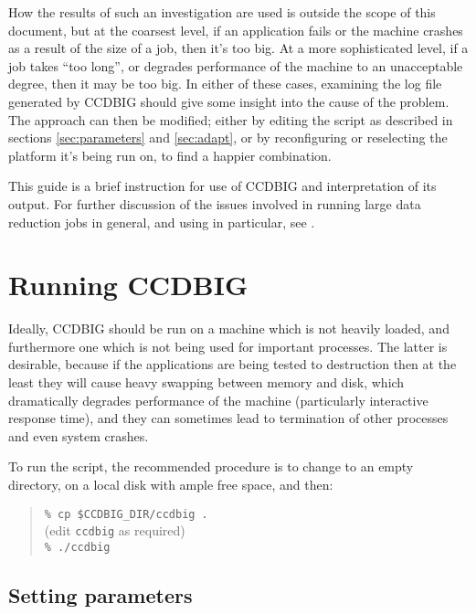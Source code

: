 How the results of such an investigation are used is
outside the scope of this document,
but at the coarsest level, if an application fails 
or the machine crashes
as a result of the size of a job,
then it's too big. 
At a more sophisticated level, if a job takes ``too long'',
or degrades performance of the machine to an unacceptable degree,
then it may be too big.
In either of these cases, examining the log file
generated by CCDBIG should give some
insight into the cause of the problem.
The approach
can then be modified;
either by editing the script as described in sections
\ref{sec:parameters} and \ref{sec:adapt},
or by reconfiguring or reselecting the platform it's being run on,
to find a happier combination.

This guide is a brief instruction for use
of CCDBIG and interpretation of its output.
For further discussion of the issues involved in running large
data reduction jobs in general, and using {\CCDPref} in particular,
see .



\section{Running CCDBIG}

Ideally, CCDBIG should be run on a machine which is not
heavily loaded, and furthermore one which is not being used
for important processes.
The latter is desirable, because if the {\CCDPref} applications
are being tested to destruction then at the least they will
cause heavy swapping between memory and disk, which 
dramatically degrades performance of the machine 
(particularly interactive response time),
and they can sometimes lead to termination of other processes and
even system crashes.

To run the script, the recommended procedure is
to change to an empty directory, on a local disk with 
ample free space, and then:
\begin{quote}
{\tt \% cp \$CCDBIG\_DIR/ccdbig .} \\
\hspace*{3em} (edit {\tt ccdbig} as required) \\
{\tt \% ./ccdbig}
\end{quote}


\subsection{Setting parameters}
 \label{sec:parameters}

